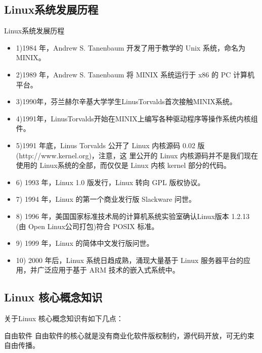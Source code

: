 \subsection{Linux系统发展历程}
\begin{ascolorbox5}{Linux系统发展历程}
\begin{itemize}
	\item 1)1984 年，Andrew S. Tanenbaum 开发了用于教学的 Unix 系统，命名为 MINIX。
	
	\item 	2)1989 年，Andrew S. Tanenbaum 将 MINIX 系统运行于 x86 的 PC 计算机平台。
	
	\item 	3)1990年，芬兰赫尔辛基大学学生LinusTorvalds首次接触MINIX系统。
	
	\item 	4)1991年，LinusTorvalds开始在MINIX上编写各种驱动程序等操作系统内核组件。
	
	\item 	5)1991 年底，Linus Torvalds 公开了 Linux 内核源码 0.02 版(http://www.kernel.org)，注意，这
		里公开的 Linux 内核源码并不是我们现在使用的 Linux系统的全部，而仅仅是 Linux 内核 kernel
		部分的代码。
	
	\item 	6) 1993 年，Linux 1.0 版发行，Linux 转向 GPL 版权协议。
	
	\item 	7) 1994 年，Linux 的第一个商业发行版 Slackware 问世。
	
	\item 	8) 1996 年，美国国家标准技术局的计算机系统实验室确认Linux版本 1.2.13 (由 Open Linux公司打包)符合 POSIX 标准。
	
	\item 	9) 1999 年，Linux 的简体中文发行版问世。
	
	\item 	10) 2000 年后，Linux 系统日趋成熟，涌现大量基于 Linux 服务器平台的应用，并广泛应用于基于 ARM 技术的嵌入式系统中。
\end{itemize}
\end{ascolorbox5}

\subsection{Linux 核心概念知识}
关于Linux 核心概念知识有如下几点：
\begin{ascboxB}{自由软件}
	自由软件的核心就是没有商业化软件版权制约，源代码开放，可无约束自由传播。
\end{ascboxB}

